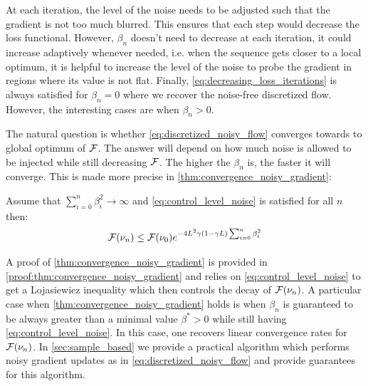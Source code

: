 \begin{remark}
	At each iteration, the level of the noise needs to be adjusted such that the gradient is not too much blurred. This ensures that each step would decrease the loss functional. However, $\beta_n$ doesn't need to decrease at each iteration, it could increase adaptively whenever needed, i.e. when  the sequence gets closer to a local optimum, it is helpful to increase the level of the noise to probe the gradient in regions where its value is not flat.
	Finally, \cref{eq:decreasing_loss_iterations} is always satisfied for $\beta_n = 0$ where we recover the noise-free discretized flow. However, the interesting cases are when $\beta_n>0$.
 \end{remark}
The natural question is whether \cref{eq:discretized_noisy_flow} converges towards to global optimum of ${{\mathcal F}}$. The answer will depend on how much noise is allowed to be injected while still decreasing ${{\mathcal F}}$. The higher the $\beta_n$ is, the faster it will converge. This is made more precise in \cref{thm:convergence_noisy_gradient}: 
 \begin{theorem}\label{thm:convergence_noisy_gradient}
 Assume that $\sum_{i=0}^n \beta_i^2 \rightarrow \infty $ and \cref{eq:control_level_noise} is satisfied for all $n$ then:
 \begin{align}
 	{{\mathcal F}}(\nu_n)\leq {{\mathcal F}}(\nu_0) e^{-4L^2\gamma(1-\gamma L)\sum_{i=0}^n \beta^2_i}
 \end{align}
 \end{theorem}
 A proof of \cref{thm:convergence_noisy_gradient} is provided in \cref{proof:thm:convergence_noisy_gradient} and relies on \cref{eq:control_level_noise} to get a Lojasiewicz inequality which then controls the decay of ${{\mathcal F}}(\nu_n)$. A particular case when \cref{thm:convergence_noisy_gradient} holds is when $\beta_n$ is guaranteed to be always greater than a minimal value $\beta^*>0$ while still having \cref{eq:control_level_noise}. In this case, one recovers linear convergence rates for ${{\mathcal F}}(\nu_n)$.
In \cref{sec:sample_based} we provide a practical algorithm which performs noisy gradient updates as in \cref{eq:discretized_noisy_flow} and provide guarantees for this algorithm.
 
 
 
